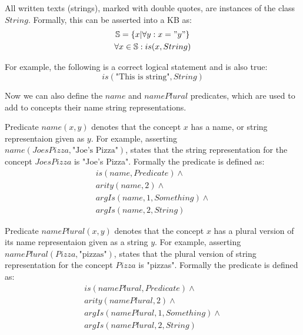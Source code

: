 \begin{definition}\label{def:string}
All written texts (strings), marked with double quotes, are instances of the 
class $String$. Formally, this can be
asserted into a KB as:
\begin{equation}\label{as:strings}
\begin{gathered}
	\mathbb{S}=\{x|\forall y:x="y"\} \\
	\forall x \in \mathbb{S}:is(x,String)
\end{gathered}
\end{equation}
\end{definition}
For example, the following is a correct logical statement and is also true:
\begin{equation*}
	is(\text{"This is string"},String)
\end{equation*}

Now we can also define the $name$ and $namePlural$ predicates, which are used 
to add to concepts their name string representations.

\begin{definition}\label{def:predName}
Predicate $name(x,y)$ denotes that the concept $x$ has a name, or string
representaion given as $y$. For example, asserting 
\\$name(JoesPizza,\text{"Joe's Pizza"})$, states that the string representation
for the concept $JoesPizza$ is "Joe's Pizza". Formally the predicate is 
defined as:
\begin{equation}\label{as:predName}
\begin{gathered}
	is(name,Predicate)\land\\
	arity(name,2)\land\\
	argIs(name,1,Something)\land\\
	argIs(name,2,String)
\end{gathered}
\end{equation}
\end{definition}

\begin{definition}\label{def:predNamePlural}
Predicate $namePlural(x,y)$ denotes that the concept $x$ has a plural version of
its name representaion given as a string $y$. For example, asserting 
\\$namePlural(Pizza,\text{"pizzas"})$, states that the plural version of 
string representation for the concept $Pizza$ is "pizzas". Formally the 
predicate is defined as:
\begin{equation}\label{as:predNamePlural}
\begin{gathered}
	is(namePlural,Predicate)\land\\
	arity(namePlural,2)\land\\
	argIs(namePlural,1,Something)\land\\
	argIs(namePlural,2,String)
\end{gathered}
\end{equation}
\end{definition}

